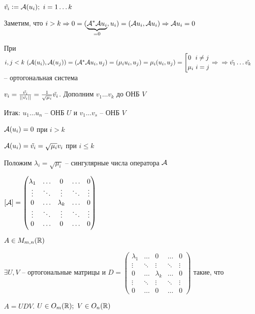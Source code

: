 \documentclass[12pt]{article}
\begin{document}
$\tilde{v_i} := \mathcal{A}(u_i);\ i = 1 \ldots k$

Заметим, что $i > k \Rightarrow 0 = (\underbrace{\mathcal{A}^*\mathcal{A} u_i}_{= 0}, u_i) = (\mathcal{A} u_i, \mathcal{A} u_i) \Rightarrow \mathcal{A} u_i = 0$

При $i, j < k\ (\mathcal{A}(u_i), \mathcal{A}(u_j)) = (\mathcal{A}^* \mathcal{A} u_i, u_j) = (\mu_i u_i, u_j) = \mu_i(u_i, u_j) = \left[ \begin{gathered}
    0\ \ i \neq j \\
    \mu_i\ i = j
\end{gathered} \right. \Rightarrow \\ \Rightarrow \tilde{v_1} \ldots \tilde{v_k}$ -- ортогональная система

$v_i = \frac{\tilde{v_i}}{|| \tilde{v_i} ||} = \frac{1}{\sqrt{\mu_i}}\tilde{v_i}$. Дополним $v_1 \ldots v_k$ до ОНБ $V$

Итак: $u_1 \ldots u_n$ -- ОНБ $U$ и $v_1 \ldots v_s$ -- ОНБ $V$

$\mathcal{A}(u_i) = 0$ при $i > k$

$\mathcal{A}(u_i) = \tilde{v_i} = \sqrt{\mu_i}v_i$ при $i \leq k$

Положим $\lambda_i = \sqrt{\mu_i}$ -- сингулярные числа оператора $\mathcal{A}$

$[\mathcal{A}] = \begin{pmatrix}
    \lambda_1 & \ldots & 0 & \ldots & 0 \\
    \vdots & \ddots & \vdots & \ddots & \vdots \\
    0 & \ldots & \lambda_k & \ldots & 0 \\
    \vdots & \ddots & \vdots & \ddots & \vdots \\
    0 & \ldots & 0 & \ldots & 0
\end{pmatrix}$

\newpage 

\begin{theo}{}
    $A \in M_{m, n}(\mathbb R)$

    $\exists U, V$ -- ортогональные матрицы и $D = \begin{pmatrix}
        \lambda_1 & \ldots & 0 & \ldots & 0 \\
        \vdots & \ddots & \vdots & \ddots & \vdots \\
        0 & \ldots & \lambda_k & \ldots & 0 \\
        \vdots & \ddots & \vdots & \ddots & \vdots \\
        0 & \ldots & 0 & \ldots & 0
    \end{pmatrix}$ такие, что 

    $A = U D V$. $U \in O_m(\mathbb R);\ V \in O_n(\mathbb R)$
\end{theo}
\end{document}
